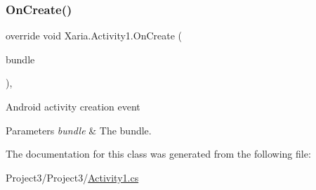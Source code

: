 \subsubsection{\texorpdfstring{On\+Create()}{OnCreate()}}
{\footnotesize\ttfamily override void Xaria.\+Activity1.\+On\+Create (\begin{DoxyParamCaption}\item[{Bundle}]{bundle }\end{DoxyParamCaption})\hspace{0.3cm}{\ttfamily [inline]}, {\ttfamily [protected]}}



Android activity creation event 


\begin{DoxyParams}{Parameters}
{\em bundle} & The bundle.\\
\hline
\end{DoxyParams}


The documentation for this class was generated from the following file\+:\begin{DoxyCompactItemize}
\item 
Project3/\+Project3/\hyperlink{Activity1_8cs}{Activity1.\+cs}\end{DoxyCompactItemize}
